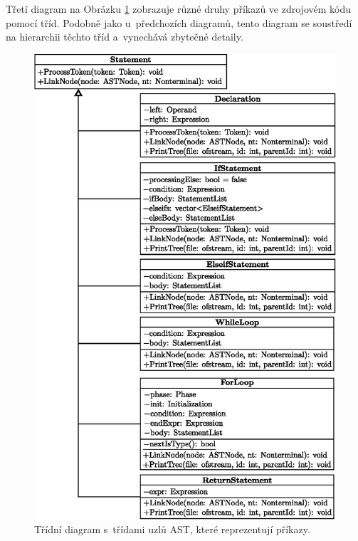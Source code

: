 Třetí diagram na Obrázku \ref{fig_hierarchie_statement} zobrazuje různé druhy příkazů ve zdrojovém kódu pomocí tříd.
Podobně jako u~předchozích diagramů, tento diagram se soustředí na hierarchii těchto tříd a~vynechává zbytečné detaily.
\begin{figure}[h!]
		\centering
		\includegraphics[height=0.88\textheight]{obrazky-figures/statement_hierarchy.eps}
		\caption{Třídní diagram s~třídami uzlů AST, které reprezentují příkazy.}
		\label{fig_hierarchie_statement}
\end{figure}



%
